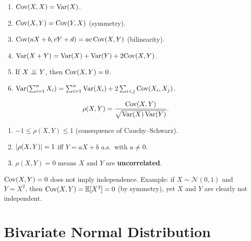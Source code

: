\begin{proposition}
\begin{enumerate}[label=(\roman*)]
    \item $\mathrm{Cov}(X, X) = \mathrm{Var}(X)$.
    \item $\mathrm{Cov}(X, Y) = \mathrm{Cov}(Y, X)$ (symmetry).
    \item $\mathrm{Cov}(aX+b, cY+d) = ac\,\mathrm{Cov}(X,Y)$ (bilinearity).
    \item $\mathrm{Var}(X+Y) = \mathrm{Var}(X) + \mathrm{Var}(Y) + 2\mathrm{Cov}(X,Y)$.
    \item If $X \perp\!\!\!\perp Y$, then $\mathrm{Cov}(X,Y) = 0$.
    \item $\mathrm{Var}\!\left(\sum_{i=1}^n X_i\right) = \sum_{i=1}^n \mathrm{Var}(X_i)
          + 2\sum_{i<j}\mathrm{Cov}(X_i, X_j)$.
\end{enumerate}
\end{proposition}

\begin{definition}
\[
    \rho(X, Y) = \frac{\mathrm{Cov}(X, Y)}{\sqrt{\mathrm{Var}(X)\,\mathrm{Var}(Y)}}.
\]
\end{definition}

\begin{theorem}
\begin{enumerate}[label=(\roman*)]
    \item $-1 \leq \rho(X,Y) \leq 1$ \quad (consequence of Cauchy--Schwarz).
    \item $\left| \rho(X,Y) \right| = 1$ iff $Y = aX + b$ a.s.\ with $a \neq 0$.
    \item $\rho(X,Y) = 0$ means $X$ and $Y$ are \textbf{uncorrelated}.
\end{enumerate}
\end{theorem}

\begin{warning}[title=\textbf{Uncorrelated $\neq$ independent}]
$\mathrm{Cov}(X,Y) = 0$ does not imply independence. Example: if $X \sim \mathcal{N}(0,1)$
and $Y = X^2$, then $\mathrm{Cov}(X,Y) = \mathbb{E}[X^3] = 0$ (by symmetry), yet $X$ and $Y$
are clearly not independent.
\end{warning}

\section{Bivariate Normal Distribution}

